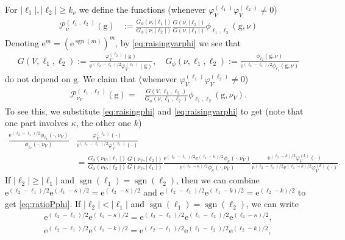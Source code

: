 \documentclass[12pt]{amsart}
\theoremstyle{definition}
\theoremstyle{remark}
\numberwithin{equation}{section}
\newcommand{\1}{{\mathbf 1}}
\newcommand{\g}{\mathrm{g}}
\newcommand{\sgn}{\operatorname{sgn}}
\begin{document}
For $|\ell_1|,|\ell_2| \geq k_\nu$ we define the functions  (whenever $\varphi^{(\ell_1)}_V\varphi^{(\ell_2)}_V \neq 0$)
\begin{align} \label{eq:unitarynorm}
\mathcal{P}^{(\ell_1,\ell_2)}_{\nu}(\g) &:= \frac{G_\phi(\nu,|\ell_1|)}{G_{\phi}(\nu,|\ell_2|)} \frac{G(\nu,|\ell_2|)}{G(\nu,|\ell_1|)} \phi_{\ell_1,\ell_2}(\g, \nu)
\end{align}
Denoting $\mathrm{e}^m=(\mathrm{e}^{\sgn(m)})^m$,  by \eqref{eq:raisingvarphi} we see that
\begin{align} \label{eq:Gtwoells}
G(V,\ell_1,\ell_2) :=  \frac{ \varphi_{V}^{(\ell_2)}(\g)}{ \mathrm{e}^{(\ell_2-\ell_1)/2}   \varphi_{V}^{(\ell_1)}(\g)}, \quad G_\phi(\nu,\ell_1,\ell_2) :=  \frac{ \phi_{\ell_2}(\g,\nu)}{ \mathrm{e}^{(\ell_2-\ell_1)/2}   \phi_{\ell_1}(\g,\nu)}   
\end{align}
do not depend on $\g$. We claim that (whenever $\varphi^{(\ell_1)}_V\varphi^{(\ell_2)}_V \neq 0$)
\begin{align} \label{eq:ratioPphi}
\mathcal{P}^{(\ell_1,\ell_2)}_{\nu_V}(\g) =& \frac{G(V,\ell_1,\ell_2) }{G_\phi(\nu,\ell_1,\ell_2)} \phi_{\ell_1,\ell_2}(\g, \nu_V).
\end{align}
To see this, we substitute  \eqref{eq:raisingphi} and \eqref{eq:raisingvarphi}  to get (note that one part involves $\kappa$, the other one $k$)
\begin{align*}
\frac{\mathrm{e}^{(\ell_2-\ell_1)/2} \phi_{\ell_1}(\cdot,\nu_V)}{\phi_{\ell_2}(\cdot,\nu_V) } & \frac{\varphi^{(\ell_2)}_V(\cdot)}{\mathrm{e}^{(\ell_2-\ell_1)/2}\varphi^{(\ell_1)}_V(\cdot) } \\
    &= \frac{G_\phi(\nu_V,|\ell_1|) }{G_\phi(\nu_V,|\ell_2|)} \frac{G(\nu_V,|\ell_2|)}{G(\nu_V,|\ell_1|) }\frac{\mathrm{e}^{(\ell_2-\ell_1)/2}  \mathrm{e}^{(\ell_1-\kappa)/2} \phi_{\kappa}(\cdot,\nu_V)} {\mathrm{e}^{(\ell_2-\kappa)/2}\phi_{\kappa}(\cdot,\nu_V)} \frac{\mathrm{e}^{(\ell_2-k)/2}\varphi_{V}^{(k)}(\cdot)}{\mathrm{e}^{(\ell_2-\ell_1)/2}  \mathrm{e}^{(\ell_1-k)/2} \varphi_{V}^{(k)}(\cdot)}.
\end{align*}
If $|\ell_2| \geq |\ell_1|$ and $\sgn(\ell_1)=\sgn(\ell_2)$, then we can combine $\mathrm{e}^{(\ell_2-\ell_1)/2}  \mathrm{e}^{(\ell_1-\kappa)/2} = \mathrm{e}^{(\ell_2-\kappa)/2}$ and $\mathrm{e}^{(\ell_2-\ell_1)/2}  \mathrm{e}^{(\ell_1-k)/2} = \mathrm{e}^{(\ell_2-k)/2}$ to get \eqref{eq:ratioPphi}. If $|\ell_2|< |\ell_1|$ and $\sgn(\ell_1)=\sgn(\ell_2)$,  we can write  \begin{align*} 
\mathrm{e}^{(\ell_2-\ell_1)/2}  \mathrm{e}^{(\ell_1-\kappa)/2} = \mathrm{e}^{(\ell_2-\ell_1)/2}  \mathrm{e}^{(\ell_1-\ell_2)/2} \mathrm{e}^{(\ell_2-\kappa)/2}, \\
\mathrm{e}^{(\ell_2-\ell_1)/2}  \mathrm{e}^{(\ell_1-k)/2} = \mathrm{e}^{(\ell_2-\ell_1)/2}  \mathrm{e}^{(\ell_1-\ell_2)/2} \mathrm{e}^{(\ell_2-k)/2},
\end{align*}
\end{document}
